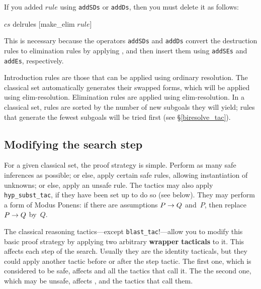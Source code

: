\begin{warn}
  If you added $rule$ using {\tt addSDs} or {\tt addDs}, then you must delete
  it as follows:
\begin{ttbox}
\(cs\) delrules [make_elim \(rule\)]
\end{ttbox}
\par\noindent
This is necessary because the operators {\tt addSDs} and {\tt addDs} convert
the destruction rules to elimination rules by applying ,
and then insert them using {\tt addSEs} and {\tt addEs}, respectively.
\end{warn}

Introduction rules are those that can be applied using ordinary resolution.
The classical set automatically generates their swapped forms, which will
be applied using elim-resolution.  Elimination rules are applied using
elim-resolution.  In a classical set, rules are sorted by the number of new
subgoals they will yield; rules that generate the fewest subgoals will be
tried first (see \S\ref{biresolve_tac}).


\subsection{Modifying the search step}
For a given classical set, the proof strategy is simple.  Perform as many
safe inferences as possible; or else, apply certain safe rules, allowing
instantiation of unknowns; or else, apply an unsafe rule.  The tactics may
also apply {\tt hyp_subst_tac}, if they have been set up to do so (see
below).  They may perform a form of Modus Ponens: if there are assumptions
$P\rightarrow Q$ and~$P$, then replace $P\rightarrow Q$ by~$Q$.

The classical reasoning tactics---except {\tt blast_tac}!---allow you to
modify this basic proof strategy by 
applying two arbitrary {\bf wrapper tacticals} to it. This affects each step of
the search.  Usually they are the identity tacticals, but they could apply 
another tactic before or after the step tactic. The first one, which is
considered to be safe, affects  and all the tactics that
call it. The the second one, which may be unsafe, affects 
,  and the tactics that call them.

